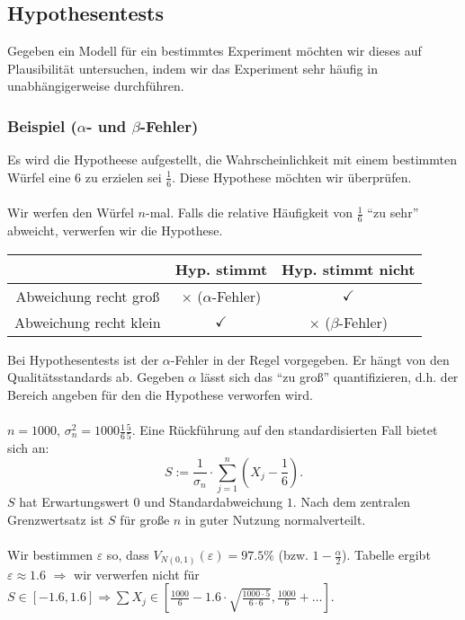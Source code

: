 \subsection{Hypothesentests}
Gegeben ein Modell f\"ur ein bestimmtes Experiment m\"ochten wir dieses auf Plausibilit\"at untersuchen, indem wir das Experiment sehr h\"aufig in unabh\"angigerweise durchf\"uhren.
\subsubsection{Beispiel ($\alpha$- und $\beta$-Fehler)}
Es wird die Hypotheese aufgestellt, die Wahrscheinlichkeit mit einem bestimmten W\"urfel eine $6$ zu erzielen sei $\frac{1}{6}$. Diese Hypothese m\"ochten wir \"uberpr\"ufen.
\\~\\
Wir werfen den W\"urfel $n$-mal. Falls die relative H\"aufigkeit von $\frac{1}{6}$ ``zu sehr'' abweicht, verwerfen wir die Hypothese.
\begin{center}
\begin{tabular}{c|c|c}
~&Hyp. stimmt&Hyp. stimmt nicht\\
\hline
Abweichung recht gro\ss{}&$\times$ ($\alpha$-Fehler)&$\checkmark$\\
\hline
Abweichung recht klein&$\checkmark$&$\times$ ($\beta$-Fehler)\\
\end{tabular}
\end{center}
Bei Hypothesentests ist der $\alpha$-Fehler in der Regel vorgegeben. Er h\"angt von den Qualit\"atsstandards ab. Gegeben $\alpha$ l\"asst sich das ``zu gro\ss{}'' quantifizieren, d.h. der Bereich angeben f\"ur den die Hypothese verworfen wird.
\\~\\
$n=1000$, $\sigma_n^2=1000\frac{1}{6}\frac{5}{5}$. Eine R\"uckf\"uhrung auf den standardisierten Fall bietet sich an:
\[
S:=\frac{1}{\sigma_n}\cdot\sum_{j=1}^n\left(X_j-\frac{1}{6}\right).
\]
$S$ hat Erwartungswert $0$ und Standardabweichung $1$. Nach dem zentralen Grenzwertsatz ist $S$ f\"ur gro\ss{}e $n$ in guter Nutzung normalverteilt.
\\~\\
Wir bestimmen $\varepsilon$ so, dass $V_{N(0,1)}(\varepsilon)=97.5\%$ (bzw. $1-\frac{\alpha}{2}$). Tabelle ergibt $\varepsilon\approx1.6$ $\Rightarrow$ wir verwerfen nicht f\"ur $S\in[-1.6,1.6]\Rightarrow\sum X_j\in[\frac{1000}{6}-1.6\cdot\sqrt{\frac{1000\cdot 5}{6\cdot 6}},\frac{1000}{6}+\ldots]$.
